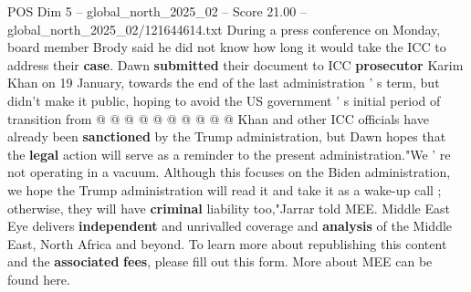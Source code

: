 \begin{textsample}{POS Dim 5 – global\_north\_2025\_02 – Score 21.00 – global\_north\_2025\_02/121644614.txt}
During a press conference on Monday, board member Brody said he did not know how long it would take the ICC to address their \textbf{case}.
Dawn \textbf{submitted} their document to ICC \textbf{prosecutor} Karim Khan on 19 January, towards the end of the last administration ' s term, but didn't make it public, hoping to avoid the US government ' s initial period of transition from @ @ @ @ @ @ @ @ @ @ Khan and other ICC officials have already been \textbf{sanctioned} by the Trump administration, but Dawn hopes that the \textbf{legal} action will serve as a reminder to the present administration."We ' re not operating in a vacuum.
Although this focuses on the Biden administration, we hope the Trump administration will read it and take it as a wake-up call ; otherwise, they will have \textbf{criminal} liability too,"Jarrar told MEE.
Middle East Eye delivers \textbf{independent} and unrivalled coverage and \textbf{analysis} of the Middle East, North Africa and beyond.
To learn more about republishing this content and the \textbf{associated} \textbf{fees}, please fill out this form.
More about MEE can be found here.

\end{textsample}
